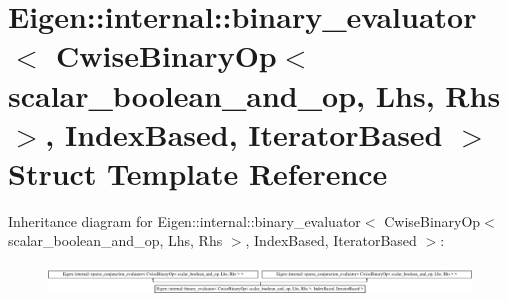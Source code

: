\hypertarget{struct_eigen_1_1internal_1_1binary__evaluator_3_01_cwise_binary_op_3_01scalar__boolean__and__op_e5783d1feefabf80ecedbbd659dac347}{}\section{Eigen\+:\+:internal\+:\+:binary\+\_\+evaluator$<$ Cwise\+Binary\+Op$<$ scalar\+\_\+boolean\+\_\+and\+\_\+op, Lhs, Rhs $>$, Index\+Based, Iterator\+Based $>$ Struct Template Reference}
\label{struct_eigen_1_1internal_1_1binary__evaluator_3_01_cwise_binary_op_3_01scalar__boolean__and__op_e5783d1feefabf80ecedbbd659dac347}
Inheritance diagram for Eigen\+:\+:internal\+:\+:binary\+\_\+evaluator$<$ Cwise\+Binary\+Op$<$ scalar\+\_\+boolean\+\_\+and\+\_\+op, Lhs, Rhs $>$, Index\+Based, Iterator\+Based $>$\+:\begin{figure}[H]
\begin{center}
\leavevmode
\includegraphics[height=0.810420cm]{struct_eigen_1_1internal_1_1binary__evaluator_3_01_cwise_binary_op_3_01scalar__boolean__and__op_e5783d1feefabf80ecedbbd659dac347}
\end{center}
\end{figure}
